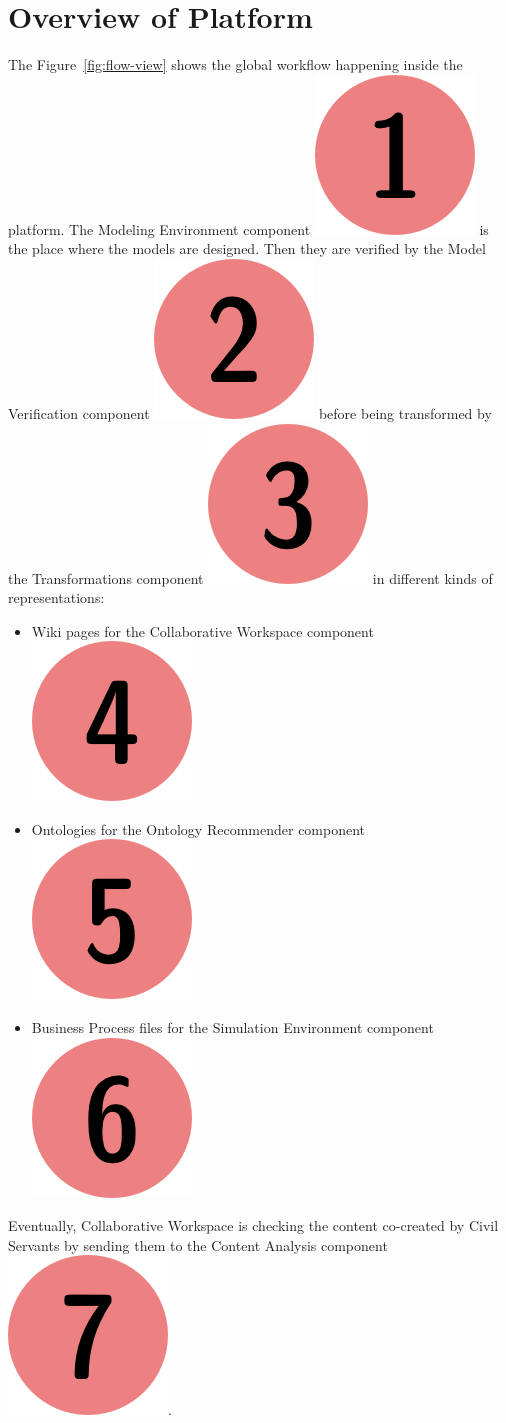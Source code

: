 \documentclass{learnpad}
\begin{document}
\section{Overview of \learnpad Platform}
The Figure~\ref{fig:flow-view} shows the global workflow happening inside the
\learnpad platform.  The Modeling Environment component
\includegraphics[height=1.5ex,keepaspectratio]{figures/1.png} is the place where
the models are designed.  Then they are verified by the Model Verification
component \includegraphics[height=1.5ex,keepaspectratio]{figures/2.png} before
being transformed by the Transformations component
\includegraphics[height=1.5ex,keepaspectratio]{figures/3.png} in different kinds
of representations:
\begin{itemize}
	\item Wiki pages for the Collaborative Workspace component
		\includegraphics[height=1.5ex,keepaspectratio]{figures/4.png}
	\item Ontologies for the Ontology Recommender component
		\includegraphics[height=1.5ex,keepaspectratio]{figures/5.png}
	\item Business Process files for the Simulation Environment component
		\includegraphics[height=1.5ex,keepaspectratio]{figures/6.png}
\end{itemize}
Eventually, Collaborative Workspace is checking the content co-created by Civil
Servants by sending them to the Content Analysis component
\includegraphics[height=1.5ex,keepaspectratio]{figures/7.png}.
\end{document}
